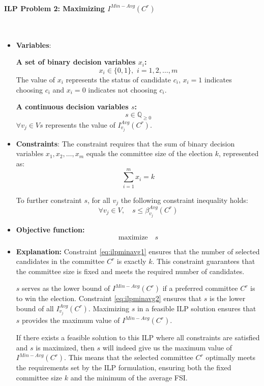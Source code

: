\documentclass{article}
\begin{document}
\paragraph*{ILP Problem 2: Maximizing $I^{Min-Avg}(C^{r})$}\mbox{} \\

\begin{itemize}
  \item \textbf{Variables}: 

\textbf{A set of binary decision variables $x_i$:} \[  x_i \in \{0, 1\} , \,\, i=1,2,\dots, m \] The value of $x_i$ represents the status of candidate $c_i$, \(x_i = 1\) indicates choosing $c_i$ and \(x_i = 0\) indicates not choosing $c_i$.


\textbf{A continuous decision variables $s$:} 
\[  s\in \mathbb{Q}_{\geq 0} \] 
$ \forall v_j \in V s$ represents the value of $I_{v_j}^{Avg}(C^{r})$.
    \item \textbf{Constraints}:
The constraint requires that the sum of binary decision variables \(x_1, x_2, \ldots, x_m\) equals the committee size of the election \(k\), represented as:
\begin{equation} \sum_{i=1}^m x_i = k     \label{eq:ilpminavg1}
\end{equation}

To further constraint $s$, for all $v_j$ the following constraint inequality holds:
\begin{equation}\forall v_j \in V, \quad s \leq \beta_{v_j}^{Avg}(C^{r})    \label{eq:ilpminavg2}
\end{equation}
  
  \item  \textbf{Objective function:}
  \[\text{maximize} \quad s\]





 \item  \textbf{Explanation:}
Constraint \ref{eq:ilpminavg1} ensures that the number of selected candidates in the committee \(C^r\) is exactly \(k\). This constraint guarantees that the committee size is fixed and meets the required number of candidates. 

\(s\) serves as the lower bound of $I^{Min-Avg}(C^{r})$ if a preferred committee \(C^r\) is to win the election. Constraint \ref{eq:ilpminavg2} ensures that $s$ is the lower bound of all \(I_{v_j}^{Avg}(C^{r})\). Maximizing \(s\) in a feasible ILP solution ensures that \(s\) provides the maximum value of \(I^{Min-Avg}(C^{r})\). 

If there exists a feasible solution to this ILP where all constraints are satisfied and \(s\) is maximized, then \(s\) will indeed give us the maximum value of \(I^{Min-Avg}(C^{r})\). This means that the selected committee \(C^r\) optimally meets the requirements set by the ILP formulation, ensuring both the fixed committee size \(k\) and the minimum of the average FSI. 






\end{itemize}
\end{document}
